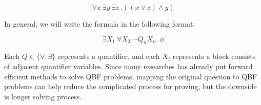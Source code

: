 \[ \forall x\ \exists y\ \exists z\ .((x\lor z)\land y) \]

In general, we will write the formula in the following format:

\[ \exists X_1\ \forall X_2\ \cdots Q_nX_n .~\phi \]

Each $Q \in \{\forall, \exists\}$ represents a quantifier, and each $X_i$ represents a block consists of adjacent quantifier variables. Since many researches has already put forward efficient methods to solve QBF problems, mapping the original question to QBF problems can help reduce the complicated process for proving, but the downside is longer solving process.

